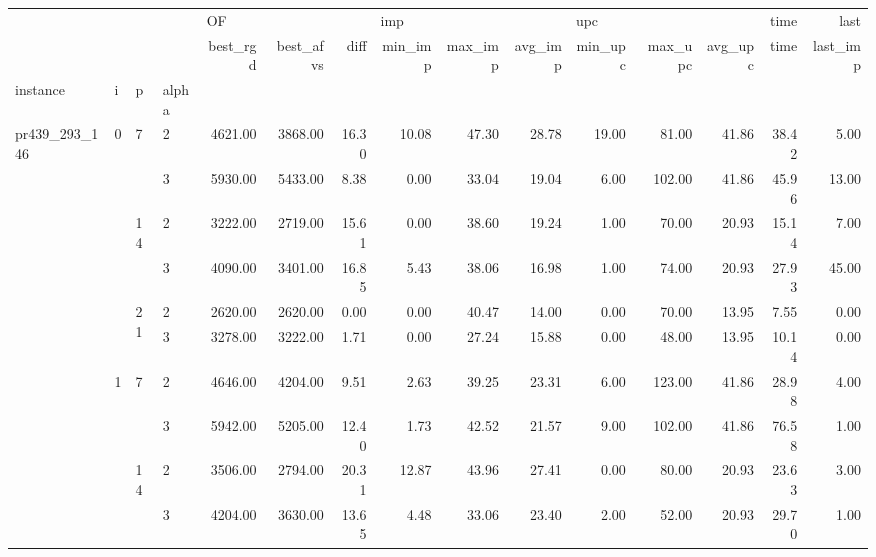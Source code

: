 \begin{tabular}{llllrrrrrrrrrrr}
\toprule
              &   &    &   & \multicolumn{3}{l}{OF} & \multicolumn{3}{l}{imp} & \multicolumn{3}{l}{upc} &  time &     last \\
              &   &    &   & best\_rgd & best\_afvs &  diff & min\_imp & max\_imp & avg\_imp & min\_upc & max\_upc & avg\_upc &  time & last\_imp \\
instance & i & p & alpha &          &           &       &         &         &         &         &         &         &       &          \\
\midrule
\multirow{60}{*}{pr439\_293\_146} & \multirow{6}{*}{0} & \multirow{2}{*}{7} & 2 &  4621.00 &   3868.00 & 16.30 &   10.08 &   47.30 &   28.78 &   19.00 &   81.00 &   41.86 & 38.42 &     5.00 \\
              &   &    & 3 &  5930.00 &   5433.00 &  8.38 &    0.00 &   33.04 &   19.04 &    6.00 &  102.00 &   41.86 & 45.96 &    13.00 \\
\cline{3-15}
              &   & \multirow{2}{*}{14} & 2 &  3222.00 &   2719.00 & 15.61 &    0.00 &   38.60 &   19.24 &    1.00 &   70.00 &   20.93 & 15.14 &     7.00 \\
              &   &    & 3 &  4090.00 &   3401.00 & 16.85 &    5.43 &   38.06 &   16.98 &    1.00 &   74.00 &   20.93 & 27.93 &    45.00 \\
\cline{3-15}
              &   & \multirow{2}{*}{21} & 2 &  2620.00 &   2620.00 &  0.00 &    0.00 &   40.47 &   14.00 &    0.00 &   70.00 &   13.95 &  7.55 &     0.00 \\
              &   &    & 3 &  3278.00 &   3222.00 &  1.71 &    0.00 &   27.24 &   15.88 &    0.00 &   48.00 &   13.95 & 10.14 &     0.00 \\
\cline{2-15}
\cline{3-15}
              & \multirow{6}{*}{1} & \multirow{2}{*}{7} & 2 &  4646.00 &   4204.00 &  9.51 &    2.63 &   39.25 &   23.31 &    6.00 &  123.00 &   41.86 & 28.98 &     4.00 \\
              &   &    & 3 &  5942.00 &   5205.00 & 12.40 &    1.73 &   42.52 &   21.57 &    9.00 &  102.00 &   41.86 & 76.58 &     1.00 \\
\cline{3-15}
              &   & \multirow{2}{*}{14} & 2 &  3506.00 &   2794.00 & 20.31 &   12.87 &   43.96 &   27.41 &    0.00 &   80.00 &   20.93 & 23.63 &     3.00 \\
              &   &    & 3 &  4204.00 &   3630.00 & 13.65 &    4.48 &   33.06 &   23.40 &    2.00 &   52.00 &   20.93 & 29.70 &     1.00 \\

\end{tabular}
